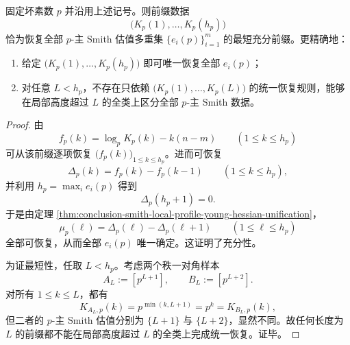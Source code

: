 \begin{theorem}[坏素数局部因子的最短充分前缀]\label{thm:conclusion-smith-local-zeta-shortest-prefix}
固定坏素数 \(p\) 并沿用上述记号。则前缀数据
\[
\bigl(K_p(1),\dots,K_p(h_p)\bigr)
\]
恰为恢复全部 \(p\)-主 Smith 估值多重集 \(\{e_i(p)\}_{i=1}^{m}\) 的最短充分前缀。更精确地：
\begin{enumerate}
  \item 给定 \(\bigl(K_p(1),\dots,K_p(h_p)\bigr)\) 即可唯一恢复全部 \(e_i(p)\)；
  \item 对任意 \(L<h_p\)，不存在只依赖 \(\bigl(K_p(1),\dots,K_p(L)\bigr)\) 的统一恢复规则，能够在局部高度超过 \(L\) 的全类上区分全部 \(p\)-主 Smith 数据。
\end{enumerate}
\end{theorem}
\begin{proof}
由
\[
f_p(k)=\log_p K_p(k)-k(n-m)
\qquad (1\le k\le h_p)
\]
可从该前缀逐项恢复 \(\bigl(f_p(k)\bigr)_{1\le k\le h_p}\)。进而可恢复
\[
\Delta_p(k)=f_p(k)-f_p(k-1)
\qquad (1\le k\le h_p),
\]
并利用 \(h_p=\max_i e_i(p)\) 得到
\[
\Delta_p(h_p+1)=0.
\]
于是由定理 \ref{thm:conclusion-smith-local-profile-young-hessian-unification}，
\[
\mu_p(\ell)=\Delta_p(\ell)-\Delta_p(\ell+1)
\qquad (1\le \ell\le h_p)
\]
全部可恢复，从而全部 \(e_i(p)\) 唯一确定。这证明了充分性。

为证最短性，任取 \(L<h_p\)。考虑两个秩一对角样本
\[
A_L:=[p^{L+1}],
\qquad
B_L:=[p^{L+2}].
\]
对所有 \(1\le k\le L\)，都有
\[
K_{A_L,p}(k)=p^{\min(k,L+1)}=p^k=K_{B_L,p}(k),
\]
但二者的 \(p\)-主 Smith 估值分别为 \(\{L+1\}\) 与 \(\{L+2\}\)，显然不同。故任何长度为 \(L\) 的前缀都不能在局部高度超过 \(L\) 的全类上完成统一恢复。证毕。
\end{proof}


